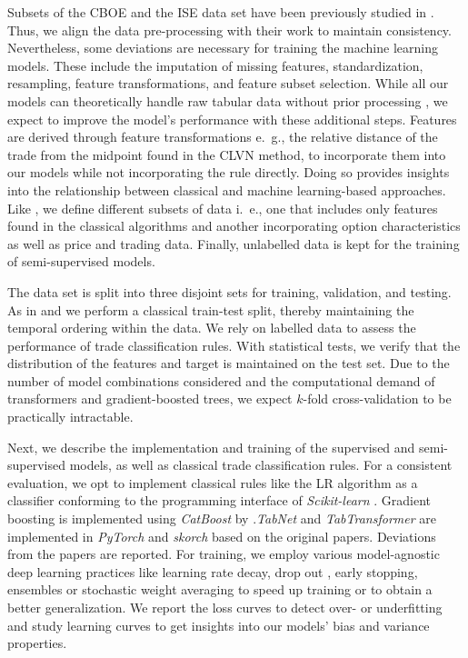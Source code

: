 Subsets of the \gls{CBOE} and the \gls{ISE} data set have been previously studied in \textcite{grauerOptionTradeClassification2022}. Thus, we align the data pre-processing with their work to maintain consistency. Nevertheless, some deviations are necessary for training the machine learning models. These include the imputation of missing features, standardization, resampling, feature transformations, and feature subset selection. While all our models can theoretically handle raw tabular data without prior processing \autocites{arikTabNetAttentiveInterpretable2020}{prokhorenkovaCatBoostUnbiasedBoosting2018}{huangTabTransformerTabularData2020}, we expect to improve the model's performance with these additional steps. Features are derived through feature transformations e.~g., the relative distance of the trade from the midpoint found in the \gls{CLVN} method, to incorporate them into our models while not incorporating the rule directly. Doing so provides insights into the relationship between classical and machine learning-based approaches. Like \textcite{ronenMachineLearningTrade2022}, we define different subsets of data i.~e., one that includes only features found in the classical algorithms and another incorporating option characteristics as well as price and trading data. Finally, unlabelled data is kept for the training of semi-supervised models.

The data set is split into three disjoint sets for training, validation, and testing. As in \textcite{ellisAccuracyTradeClassification2000} and \textcite{ronenMachineLearningTrade2022} we perform a classical train-test split, thereby maintaining the temporal ordering within the data. We rely on labelled data to assess the performance of trade classification rules. With statistical tests, we verify that the distribution of the features and target is maintained on the test set. Due to the number of model combinations considered and the computational demand of transformers and gradient-boosted trees, we expect $k$-fold cross-validation to be practically intractable.

Next, we describe the implementation and training of the supervised and semi-supervised models, as well as classical trade classification rules. 
For a consistent evaluation, we opt to implement classical rules like the \gls{LR} algorithm as a classifier conforming to the programming interface of \textit{Scikit-learn} \autocite{pedregosaScikitlearnMachineLearning2018}.
Gradient boosting is implemented using \textit{CatBoost} by \textcite{prokhorenkovaCatBoostUnbiasedBoosting2018}.\textit{TabNet} and \textit{TabTransformer} are implemented in \textit{PyTorch} \autocite{paszkePyTorchImperativeStyle2019} and \textit{skorch} based on the original papers. Deviations from the papers are reported.
For training, we employ various model-agnostic deep learning practices like learning rate decay, drop out \autocite{hintonImprovingNeuralNetworks2012}, early stopping, ensembles \autocite{huangSnapshotEnsemblesTrain2017} or stochastic weight averaging \autocite{izmailovAveragingWeightsLeads2019} to speed up training or to obtain a better generalization. We report the loss curves to detect over- or underfitting and study learning curves to get insights into our models' bias and variance properties.  


